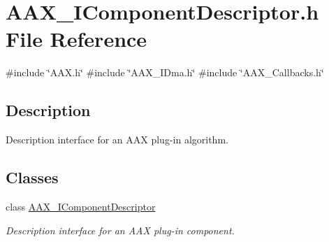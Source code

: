 \hypertarget{a00569}{}\section{A\+A\+X\+\_\+\+I\+Component\+Descriptor.\+h File Reference}
\label{a00569}
{\ttfamily \#include \char`\"{}A\+A\+X.\+h\char`\"{}}\newline
{\ttfamily \#include \char`\"{}A\+A\+X\+\_\+\+I\+Dma.\+h\char`\"{}}\newline
{\ttfamily \#include \char`\"{}A\+A\+X\+\_\+\+Callbacks.\+h\char`\"{}}\newline


\subsection{Description}
Description interface for an A\+AX plug-\/in algorithm. 

\subsection*{Classes}
\begin{DoxyCompactItemize}
\item 
class \mbox{\hyperlink{a01781}{A\+A\+X\+\_\+\+I\+Component\+Descriptor}}
\begin{DoxyCompactList}\small\item\em Description interface for an A\+AX plug-\/in component. \end{DoxyCompactList}\end{DoxyCompactItemize}
